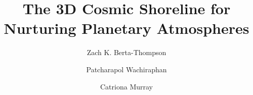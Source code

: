 \documentclass[modern,linenumbers,trackchanges]{aastex7}
\begin{document}
\title{The 3D Cosmic Shoreline for Nurturing Planetary Atmospheres}



\author[orcid=0000-0002-3321-4924,sname='Berta-Thompson']{Zach K. Berta-Thompson}


\author[orcid=0000-0001-6484-7559,sname='Wachiraphan']{Patcharapol Wachiraphan}



\author[orcid=0000-0001-8504-5862,sname='Murray']{Catriona Murray}



\newcommand{\lnw}{-1.39 \pm 0.33}
\newcommand{\logfo}{2.52_{-0.29}^{+0.44}}
\newcommand{\p}{5.79_{-0.41}^{+0.59}}
\newcommand{\q}{1.06_{-0.19}^{+0.27}}
\newcommand{\w}{0.248_{-0.068}^{+0.099}}
\newcommand{\logLnohz}{-2.38_{-0.29}^{+0.23}}
\newcommand{\Lnohz}{0.004_{-0.002}^{+0.003}}



\newcommand{\mrb}{0.041 \pm 0.034}
\newcommand{\mrbsigma}{-1.05 \pm 0.1}
\newcommand{\mrm}{3.38 \pm 0.029}
\newcommand{\mrmsigma}{-0.178 \pm 0.036}

\newcommand{\hzlum}{?}
\newcommand{\hzmass}{?}
\newcommand{\hztype}{?}
\end{document}
